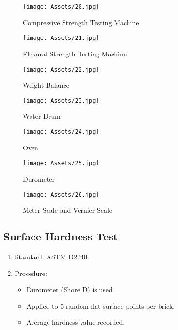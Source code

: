 \begin{figure}[H]
	\centering
	\begin{minipage}{0.48\textwidth}
		\centering
		\texttt{[image: Assets/20.jpg]}
		\caption{Compressive Strength Testing Machine  }
	\end{minipage}\hfill
	\begin{minipage}{0.48\textwidth}
		\centering
		\texttt{[image: Assets/21.jpg]}
		\caption{Flexural Strength Testing Machine}
	\end{minipage}

	\centering
	\begin{minipage}{0.48\textwidth}
		\centering
		\vspace{1cm}
		\texttt{[image: Assets/22.jpg]}
		\caption{Weight Balance}
	\end{minipage} \hfill
	\begin{minipage}{0.48\textwidth}
		\centering
		\vspace{1cm}
		\texttt{[image: Assets/23.jpg]}
		\caption{Water Drum}
	\end{minipage}

\end{figure}


\begin{figure}[H]
	\centering
	\begin{minipage}{0.48\textwidth}
		\centering
		\texttt{[image: Assets/24.jpg]}
		\caption{Oven}
	\end{minipage}\hfill
	\begin{minipage}{0.48\textwidth}
		\centering
		\texttt{[image: Assets/25.jpg]}
		\caption{Durometer}
	\end{minipage}

	\begin{minipage}{1\textwidth}
		\centering
		\vspace{1cm}
		\texttt{[image: Assets/26.jpg]}
		\caption{Meter Scale and Vernier Scale}
	\end{minipage}
\end{figure}

\subsection{Surface Hardness Test}
\begin{enumerate}
	\item Standard: ASTM D2240.
	\item Procedure:
	      \begin{itemize}
		      \item Durometer (Shore D) is used.
		      \item Applied to 5 random flat surface points per brick.
		      \item Average hardness value recorded.
	      \end{itemize}
\end{enumerate}

